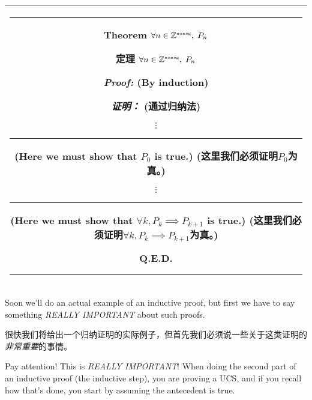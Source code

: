 \begin{center}
\begin{tabular}{|c|} \hline
\rule{16pt}{0pt}\begin{minipage}{.75\textwidth}

\rule{0pt}{16pt}{\bf \large Theorem} $ \displaystyle \forall n \in {\mathbb Z}^{\mbox{\tiny noneg}}, \; P_n $

{\bf \large 定理} $ \displaystyle \forall n \in {\mathbb Z}^{\mbox{\tiny noneg}}, \; P_n $
\medskip

\rule{0pt}{20pt} {\em Proof:} (By induction)

{\em 证明：} (通过归纳法)

\noindent {\bf Basis:}

\noindent {\bf 基础步骤：}

\begin{center}
$\vdots$ \rule{36pt}{0pt} \begin{minipage}[c]{1.7 in} (Here we must show that $P_0$ is true.) (这里我们必须证明$P_0$为真。) \end{minipage}
\end{center}

\noindent {\bf Inductive step:}

\noindent {\bf 归纳步骤：}

\begin{center}
$\vdots$ \rule{36pt}{0pt} \begin{minipage}[c]{1.7 in} (Here we must show that $\forall k,  P_k \implies P_{k+1}$ is true.) (这里我们必须证明$\forall k,  P_k \implies P_{k+1}$为真。) \end{minipage}
\end{center}

\rule{0pt}{0pt} \hspace{\fill} Q.E.D.
\rule[-10pt]{0pt}{16pt}
\end{minipage} \rule{16pt}{0pt} \\ \hline
\end{tabular}
\end{center}
\medskip

Soon we'll do an actual example of an inductive 
proof, but first we have to say something \emph{REALLY IMPORTANT}
about such proofs.

很快我们将给出一个归纳证明的实际例子，但首先我们必须说一些关于这类证明的\emph{非常重要}的事情。

Pay attention! This is \emph{REALLY IMPORTANT}!
When doing the second part of an inductive proof (the inductive step),
you are proving a UCS, and if you recall how that's done, you start
by assuming the antecedent is true.

